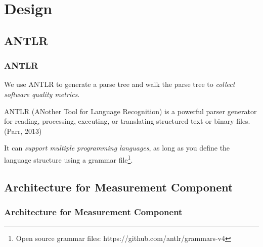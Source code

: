 \section{Design}

\subsection{ANTLR}
\begin{frame}
\frametitle{ANTLR}

We use ANTLR to generate a parse tree and walk the parse tree to \emph{collect software quality metrics}.

\begin{definition}
ANTLR (ANother Tool for Language Recognition) is a powerful parser generator for reading, processing, executing, or translating structured text or binary files. (Parr, 2013)
\end{definition}

It can \emph{support multiple programming languages}, as long as you define the language structure using a grammar file\footnote{Open source grammar files: https://github.com/antlr/grammars-v4}.

\end{frame}

\subsection{Architecture for Measurement Component}
\begin{frame}
\frametitle{Architecture for Measurement Component}


\end{frame}

